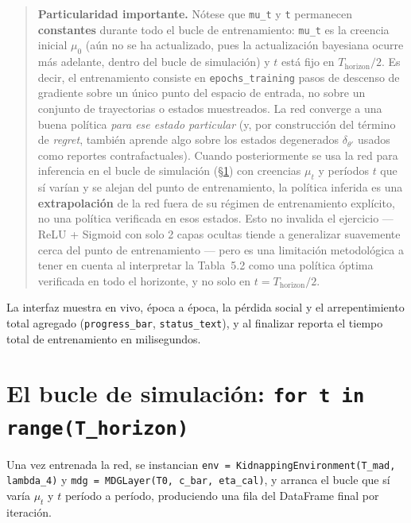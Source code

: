 \documentclass[ecta,nameyear,draft]{econsocart}
\newcommand{\pyvar}[1]{\texttt{#1}}
\begin{document}
\begin{quotation}
\noindent\textbf{Particularidad importante.} Nótese que \pyvar{mu\_t} y \pyvar{t} permanecen
\textbf{constantes} durante todo el bucle de entrenamiento: \pyvar{mu\_t} es la creencia
inicial $\mu_0$ (aún no se ha actualizado, pues la actualización bayesiana ocurre más adelante,
dentro del bucle de simulación) y $t$ está fijo en $T_{\mathrm{horizon}}/2$. Es decir, el
entrenamiento consiste en \pyvar{epochs\_training} pasos de descenso de gradiente sobre un
\'unico punto del espacio de entrada, no sobre un conjunto de trayectorias o estados
muestreados. La red converge a una buena política \emph{para ese estado particular} (y, por
construcción del término de \emph{regret}, también aprende algo sobre los estados degenerados
$\delta_{\theta'}$ usados como reportes contrafactuales). Cuando posteriormente se usa la red
para inferencia en el bucle de simulación (\S\ref{sec:loop}) con creencias $\mu_t$ y períodos
$t$ que sí varían y se alejan del punto de entrenamiento, la política inferida es una
\textbf{extrapolación} de la red fuera de su régimen de entrenamiento explícito, no una
política verificada en esos estados. Esto no invalida el ejercicio --- ReLU + Sigmoid con
solo 2 capas ocultas tiende a generalizar suavemente cerca del punto de entrenamiento --- pero
es una limitación metodológica a tener en cuenta al interpretar la Tabla~5.2 como una
política óptima verificada en todo el horizonte, y no solo en $t=T_{\mathrm{horizon}}/2$.
\end{quotation}

La interfaz muestra en vivo, época a época, la pérdida social y el arrepentimiento total
agregado (\pyvar{progress\_bar}, \pyvar{status\_text}), y al finalizar reporta el tiempo total
de entrenamiento en milisegundos.

\section{El bucle de simulación: \texttt{for t in range(T\_horizon)}}\label{sec:loop}

Una vez entrenada la red, se instancian \pyvar{env = KidnappingEnvironment(\allowbreak T\_mad,
lambda\_4)} y \pyvar{mdg = MDGLayer(\allowbreak T0, c\_bar, eta\_cal)}, y arranca el bucle que sí
varía $\mu_t$ y $t$ período a período, produciendo una fila del DataFrame final por iteración.
\end{document}
